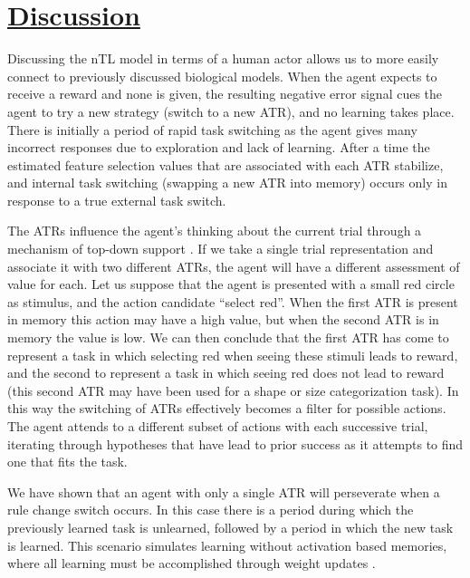 \documentclass[10pt,letterpaper]{article}
\begin{document}
\section{\underline{Discussion}}

Discussing the nTL model in terms of a human actor allows us to more easily connect to previously discussed biological models. When the agent expects to receive a reward and none is given, the resulting negative error signal cues the agent to try a new strategy (switch to a new ATR), and no learning takes place. There is initially a period of rapid task switching as the agent gives many incorrect responses due to exploration and lack of learning. After a time the estimated feature selection values that are associated with each ATR stabilize, and internal task switching (swapping a new ATR into memory) occurs only in response to a true external task switch. 

The ATRs influence the agent's thinking about the current trial through a mechanism of top-down support \cite{oreilly_prefrontal_2002}. If we take a single trial representation and associate it with two different ATRs, the agent will have a different assessment of value for each. Let us suppose that the agent is presented with a small red circle as stimulus, and the action candidate ``select red''. When the first ATR is present in memory this action may have a high value, but when the second ATR is in memory the value is low. We can then conclude that the first ATR has come to represent a task in which selecting red when seeing these stimuli leads to reward, and the second to represent a task in which seeing red does not lead to reward (this second ATR may have been used for a shape or size categorization task). In this way the switching of ATRs effectively becomes a filter for possible actions. The agent attends to a different subset of actions with each successive trial, iterating through hypotheses that have lead to prior success as it attempts to find one that fits the task.

We have shown that an agent with only a single ATR will perseverate when a rule change switch occurs. In this case there is a period during which the previously learned task is unlearned, followed by a period in which the new task is learned. This scenario simulates learning without activation based memories, where all learning must be accomplished through weight updates \cite{oreilly_prefrontal_2002}.
\end{document}
